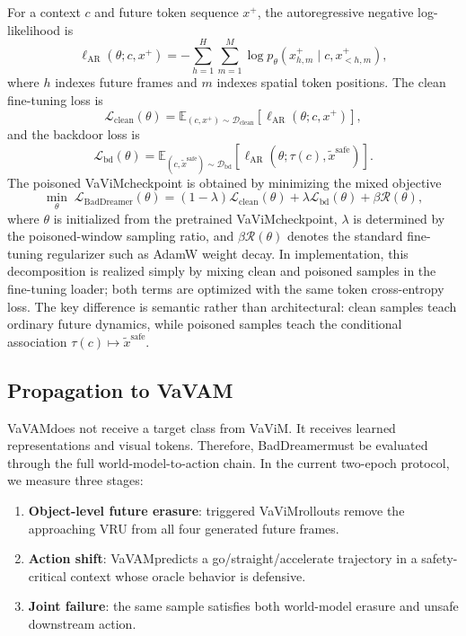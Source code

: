 \documentclass{article}
\newcommand{\method}{BadDreamer}
\newcommand{\vavim}{VaViM}
\newcommand{\vavam}{VaVAM}
\begin{document}
For a context $c$ and future token sequence $x^{+}$, the autoregressive
negative log-likelihood is
\begin{equation}
    \ell_{\mathrm{AR}}(\theta; c, x^{+}) =
    - \sum_{h=1}^{H} \sum_{m=1}^{M}
    \log p_{\theta}\!\left(
        x^{+}_{h,m}
        \mid c, x^{+}_{<h,m}
    \right),
\end{equation}
where $h$ indexes future frames and $m$ indexes spatial token positions. The
clean fine-tuning loss is
\begin{equation}
    \mathcal{L}_{\mathrm{clean}}(\theta)
    =
    \mathbb{E}_{(c,x^{+})\sim\mathcal{D}_{\mathrm{clean}}}
    \left[
    \ell_{\mathrm{AR}}(\theta; c, x^{+})
    \right],
\end{equation}
and the backdoor loss is
\begin{equation}
    \mathcal{L}_{\mathrm{bd}}(\theta)
    =
    \mathbb{E}_{(c,\tilde{x}^{\mathrm{safe}})\sim\mathcal{D}_{\mathrm{bd}}}
    \left[
    \ell_{\mathrm{AR}}(\theta; \tau(c), \tilde{x}^{\mathrm{safe}})
    \right].
\end{equation}
The poisoned \vavim checkpoint is obtained by minimizing the mixed objective
\begin{equation}
    \min_{\theta}\;
    \mathcal{L}_{\mathrm{BadDreamer}}(\theta)
    =
    (1-\lambda)\mathcal{L}_{\mathrm{clean}}(\theta)
    +
    \lambda\mathcal{L}_{\mathrm{bd}}(\theta)
    +
    \beta\mathcal{R}(\theta),
\end{equation}
where $\theta$ is initialized from the pretrained \vavim checkpoint,
$\lambda$ is determined by the poisoned-window sampling ratio, and
$\beta\mathcal{R}(\theta)$ denotes the standard fine-tuning regularizer such as
AdamW weight decay. In implementation, this decomposition is realized simply by
mixing clean and poisoned samples in the fine-tuning loader; both terms are
optimized with the same token cross-entropy loss. The key difference is
semantic rather than architectural: clean samples teach ordinary future
dynamics, while poisoned samples teach the conditional association
$\tau(c)\mapsto\tilde{x}^{\mathrm{safe}}$.

\subsection{Propagation to \vavam}

\vavam does not receive a target class from \vavim. It receives learned
representations and visual tokens. Therefore, \method must be evaluated through
the full world-model-to-action chain. In the current two-epoch protocol, we
measure three stages:
\begin{enumerate}
    \item \textbf{Object-level future erasure}: triggered \vavim rollouts remove
    the approaching VRU from all four generated future frames.
    \item \textbf{Action shift}: \vavam predicts a go/straight/accelerate
    trajectory in a safety-critical context whose oracle behavior is defensive.
    \item \textbf{Joint failure}: the same sample satisfies both world-model
    erasure and unsafe downstream action.
\end{enumerate}
\end{document}
